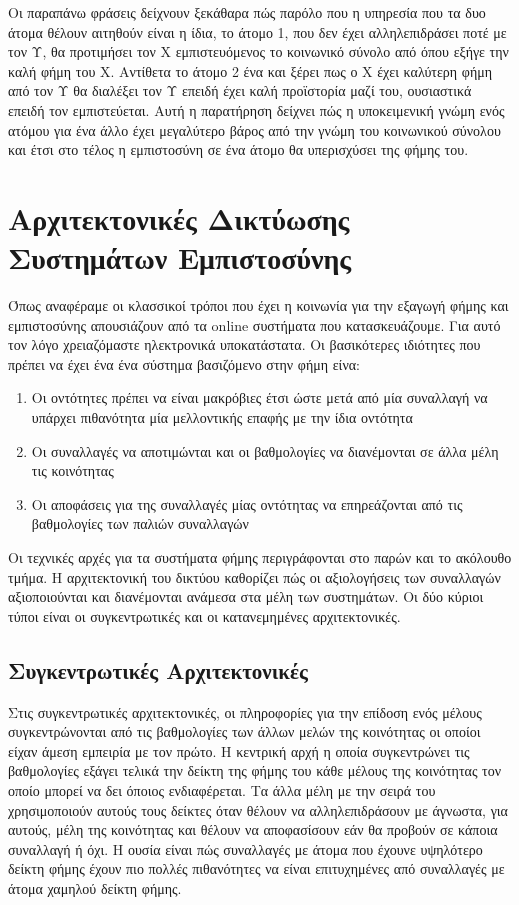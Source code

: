 Οι παραπάνω φράσεις δείχνουν ξεκάθαρα πώς παρόλο που η υπηρεσία που τα δυο άτομα θέλουν αιτηθούν είναι η ίδια, το άτομο 1, που δεν έχει αλληλεπιδράσει ποτέ με τον Υ, θα προτιμήσει τον Χ εμπιστευόμενος το κοινωνικό σύνολο από όπου εξήγε την καλή φήμη του Χ. Αντίθετα το άτομο 2 ένα και ξέρει πως ο Χ έχει καλύτερη φήμη από τον Υ θα διαλέξει τον Υ επειδή έχει καλή προϊστορία μαζί του, ουσιαστικά επειδή τον εμπιστεύεται. Αυτή η παρατήρηση δείχνει πώς η υποκειμενική γνώμη ενός ατόμου για ένα άλλο έχει μεγαλύτερο βάρος από την γνώμη του κοινωνικού σύνολου και έτσι στο τέλος η εμπιστοσύνη σε ένα άτομο θα υπερισχύσει της φήμης του.

\section{Αρχιτεκτονικές Δικτύωσης Συστημάτων Εμπιστοσύνης}

Όπως αναφέραμε οι κλασσικοί τρόποι που έχει η κοινωνία για την εξαγωγή φήμης και εμπιστοσύνης απουσιάζουν από τα online συστήματα που κατασκευάζουμε. Για αυτό τον λόγο χρειαζόμαστε ηλεκτρονικά υποκατάστατα. Οι βασικότερες ιδιότητες που πρέπει να έχει ένα ένα σύστημα βασιζόμενο στην φήμη είνα: %

\begin{enumerate}
\item Οι οντότητες πρέπει να είναι μακρόβιες έτσι ώστε μετά από μία συναλλαγή να υπάρχει πιθανότητα μία μελλοντικής επαφής με την ίδια οντότητα

\item Οι συναλλαγές να αποτιμώνται και οι βαθμολογίες να διανέμονται σε άλλα μέλη τις κοινότητας

\item Οι αποφάσεις για της συναλλαγές μίας οντότητας να επηρεάζονται από τις βαθμολογίες των παλιών συναλλαγών
\end{enumerate}

Οι τεχνικές αρχές για τα συστήματα φήμης περιγράφονται στο παρών και το ακόλουθο τμήμα. Η αρχιτεκτονική του δικτύου καθορίζει πώς οι αξιολογήσεις των συναλλαγών αξιοποιούνται και διανέμονται ανάμεσα στα μέλη των συστημάτων. Οι δύο κύριοι τύποι είναι οι συγκεντρωτικές και οι κατανεμημένες αρχιτεκτονικές.%
\subsection{Συγκεντρωτικές Αρχιτεκτονικές}

Στις συγκεντρωτικές αρχιτεκτονικές, οι πληροφορίες για την επίδοση ενός μέλους συγκεντρώνονται από τις βαθμολογίες των άλλων μελών της κοινότητας οι οποίοι είχαν άμεση εμπειρία με τον πρώτο. Η κεντρική αρχή η οποία συγκεντρώνει τις βαθμολογίες εξάγει τελικά την δείκτη της φήμης του κάθε μέλους της κοινότητας τον οποίο μπορεί να δει όποιος ενδιαφέρεται. Τα άλλα μέλη με την σειρά του χρησιμοποιούν αυτούς τους δείκτες όταν θέλουν να αλληλεπιδράσουν με άγνωστα, για αυτούς, μέλη της κοινότητας και θέλουν να αποφασίσουν εάν θα προβούν σε κάποια συναλλαγή ή όχι. Η ουσία είναι πώς συναλλαγές με άτομα που έχουνε υψηλότερο δείκτη φήμης έχουν πιο πολλές πιθανότητες να είναι επιτυχημένες από συναλλαγές με άτομα χαμηλού δείκτη φήμης.

